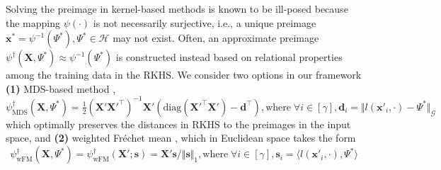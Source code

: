 
Solving the preimage in kernel-based methods is known to be ill-posed \citep{Mika1999kpca} because the mapping $\psi(\cdot)$ is not necessarily surjective, i.e., a unique preimage $\mathbf{x}^* = \psi^{-1}(\Psi^*), \Psi^* \in \mathcal{H}$ may not exist. Often, an approximate preimage $\psi^{\dagger}(\mathbf{X}, \Psi^*) \approx \psi^{-1}(\Psi^*)$ is constructed instead based on relational properties among the training data in the RKHS. We consider two options in our framework \textbf{(1)} MDS-based method \citep{kwok2004pre,honeine2011preimage}, 
\begin{equation}
\psi_{\textrm{MDS}}^{\dagger}(\mathbf{X}, \Psi^*) = \tfrac{1}{2}(\mathbf{X}'\mathbf{X}'^\top)^{-1}\mathbf{X}'(\textrm{diag}(\mathbf{X}'^\top \mathbf{X}') - \mathbf{d}^\top), \textrm{where}\;\forall i \in [\gamma], \mathbf{d}_i = \Vert l(\mathbf{x}'_i, \cdot) - \Psi^* \Vert_{\mathcal{G}}
\end{equation}
which optimally preserves the distances in RKHS to the preimages in the input space, and \textbf{(2)} weighted Fr\'{e}chet mean \citep{friedman2001elements}, which in Euclidean space takes the form
\begin{equation}
\label{eq:wfm_euc}
\psi_{\textrm{wFM}}^{\dagger}(\mathbf{X}, \Psi^*) = \psi_{\textrm{wFM}}^{\dagger}(\mathbf{X}'; \mathbf{s}) = \mathbf{X}'\mathbf{s}/\Vert \mathbf{s} \Vert_1, \textrm{where}\;\forall i \in [\gamma],\mathbf{s}_i = \langle l(\mathbf{x}'_i, \cdot), \Psi^* \rangle
\end{equation}

